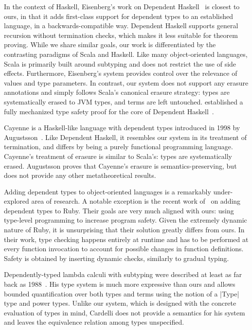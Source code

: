 In the context of Haskell, Eisenberg's work on Dependent Haskell~\citep{eisenberg2016dependent} is closest to ours, in that it adds first-class support for dependent types to an established language, in a backwards-compatible way.
Dependent Haskell supports general recursion without termination checks, which makes it less suitable for theorem proving.
While we share similar goals, our work is differentiated by the contrasting paradigms of Scala and Haskell.
Like many object-oriented languages, Scala is primarily built around subtyping and does not restrict the use of side effects.
Furthermore, Eisenberg's system provides control over the relevance of values and type parameters.
In contrast, our system does not support any erasure annotations and simply follows Scala's canonical erasure strategy: types are systematically erased to JVM types, and terms are left untouched.
\citeauthor{weirich2017a} established a fully mechanized type safety proof for the core of Dependent Haskell~\citep{weirich2017a}.

Cayenne is a Haskell-like language with dependent types introduced in 1998 by Augustsson~\citep{augustsson1998cayenne}.
Like Dependent Haskell, it resembles our system in its treatment of termination, and differs by being a purely functional programming language.
Cayenne's treatment of erasure is similar to Scala's: types are systematically erased.
Augustsson proves that Cayenne's erasure is semantics-preserving, but does not provide any other metatheoretical results.

Adding dependent types to object-oriented languages is a remarkably under-explored area of research.
A notable exception is the recent work of~\cite{kazerounian2019type} on adding dependent types to Ruby.
Their goals are very much aligned with ours: using type-level programming to increase program safety.
Given the extremely dynamic nature of Ruby, it is unsurprising that their solution greatly differs from ours.
In their work, type checking happens entirely at runtime and has to be performed at every function invocation to account for possible changes in function definitions.
Safety is obtained by inserting dynamic checks, similarly to gradual typing.

Dependently-typed lambda calculi with subtyping were described at least as far back as 1988~\citep{cardelli1988structural}.
His type system is much more expressive than ours and allows bounded quantification over both types and terms using the notion of a |Type| type and power types.
Unlike our system, which is designed with the concrete evaluation of types in mind, Cardelli does not provide a semantics for his system and leaves the equivalence relation among types unspecified.

